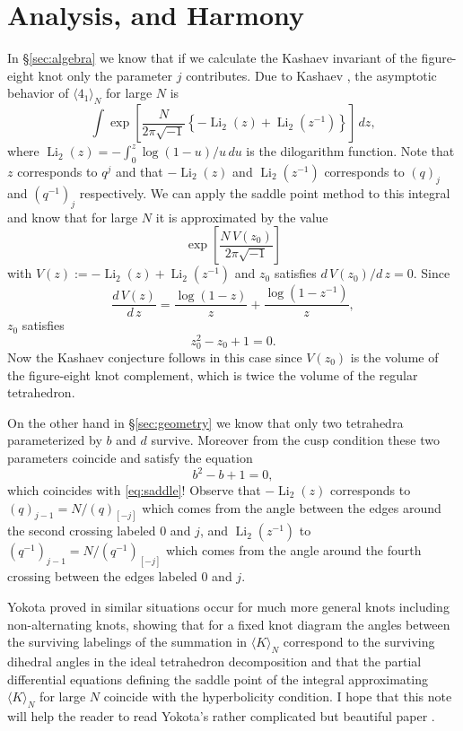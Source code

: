 \documentclass[a4paper]{amsart}
\theoremstyle{plain}
\theoremstyle{definition}
\theoremstyle{remark}
\numberwithin{equation}{section}
\numberwithin{figure}{section}
\begin{document}
\section{Analysis, and Harmony}\label{sec:harmony}
In \S\ref{sec:algebra} we know that if we calculate the Kashaev invariant
of the figure-eight knot only the parameter $j$ contributes.
Due to Kashaev \cite{Kashaev:LETMP97}, the asymptotic behavior of
$\langle 4_1\rangle_N$ for large $N$ is
\begin{equation*}%
  \int\exp
  \left[
    \frac{N}{2\pi\sqrt{-1}}
    \left\{
      -\operatorname{Li}_2(z)+\operatorname{Li}_2(z^{-1})
    \right\}
  \right]\,dz,
\end{equation*}
where $\operatorname{Li}_2(z)=-\int_{0}^{z}\log(1-u)/u\,du$ is
the dilogarithm function.
Note that $z$ corresponds to $q^{j}$ and that $-\operatorname{Li}_2(z)$
and $\operatorname{Li}_2(z^{-1})$
corresponds to $(q)_{j}$ and $(q^{-1})_{j}$ respectively.
We can apply the saddle point method to this integral and know that
for large $N$ it is approximated by the value
\begin{equation*}
  \exp\left[\frac{N\,V(z_0)}{2\pi\sqrt{-1}}\right]
\end{equation*}
with $V(z):=-\operatorname{Li}_2(z)+\operatorname{Li}_2(z^{-1})$
and $z_0$ satisfies $d\,V(z_0)/d\,z=0$.
Since
\begin{equation*}
  \frac{d\,V(z)}{d\,z}=\frac{\log(1-z)}{z}+\frac{\log(1-z^{-1})}{z},
\end{equation*}
$z_0$ satisfies
\begin{equation}\label{eq:saddle}
  z_0^2-z_0+1=0.
\end{equation}
Now the Kashaev conjecture follows in this case since $V(z_0)$ is the
volume of the figure-eight knot complement, which is twice the volume 
of the regular tetrahedron.
\par
On the other hand in \S\ref{sec:geometry} we know that only two tetrahedra
parameterized by $b$ and $d$ survive.
Moreover from the cusp condition these two parameters coincide and satisfy
the equation
\begin{equation*}
  b^2-b+1=0,
\end{equation*}
which coincides with \eqref{eq:saddle}!
Observe that $-\operatorname{Li}_2(z)$ corresponds to $(q)_{j-1}=N/(q)_{[-j]}$
which comes from the angle between the edges around the second crossing labeled
$0$ and $j$, and $\operatorname{Li}_2(z^{-1})$ to
$(q^{-1})_{j-1}=N/(q^{-1})_{[-j]}$ which comes from the angle around the fourth
crossing between the edges labeled $0$ and $j$.
\par
Yokota proved in \cite{Yokota:volume} similar situations occur
for much more general knots including non-alternating knots, showing
that for a fixed knot diagram the angles between the surviving labelings of the
summation in $\langle{K}\rangle_N$ correspond to the surviving dihedral angles
in the ideal tetrahedron decomposition and that the partial differential
equations defining the saddle point of the integral approximating
$\langle{K}\rangle_N$ for large $N$ coincide with the hyperbolicity condition.
I hope that this note will help the reader to read Yokota's rather complicated
but beautiful paper \cite{Yokota:volume}.


\end{document}
